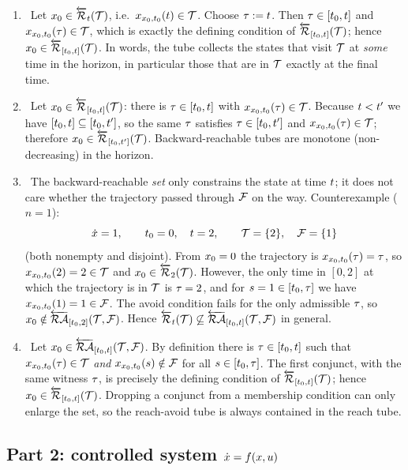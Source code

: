 \begin{enumerate}[label=(\alph*), itemsep=3pt]

\item \TRUE\
Let ${x}_0\in\overleftarrow{{\mathcal{R}}}_{{t}}({\mathcal{T}})$, i.e.\ ${x}_{{x}_0,{t}_0}({t})\in{\mathcal{T}}$. Choose ${\tau}:={t}$. Then
${\tau}\in[{t}_0,{t}]$ and ${x}_{{x}_0,{t}_0}({\tau})\in{\mathcal{T}}$, which is exactly the defining condition of
$\overleftarrow{{\mathcal{R}}}_{[{t}_0,{t}]}({\mathcal{T}})$; hence ${x}_0\in\overleftarrow{{\mathcal{R}}}_{[{t}_0,{t}]}({\mathcal{T}})$. In words, the tube collects the
states that visit ${\mathcal{T}}$ at \emph{some} time in the horizon, in particular those that are in
${\mathcal{T}}$ exactly at the final time.

\item \TRUE\
Let ${x}_0\in\overleftarrow{{\mathcal{R}}}_{[{t}_0,{t}]}({\mathcal{T}})$: there is ${\tau}\in[{t}_0,{t}]$ with
${x}_{{x}_0,{t}_0}({\tau})\in{\mathcal{T}}$. Because ${t}<{t}'$ we have $[{t}_0,{t}]\subseteq[{t}_0,{t}']$,
so the same ${\tau}$ satisfies ${\tau}\in[{t}_0,{t}']$ and ${x}_{{x}_0,{t}_0}({\tau})\in{\mathcal{T}}$; therefore
${x}_0\in\overleftarrow{{\mathcal{R}}}_{[{t}_0,{t}']}({\mathcal{T}})$. Backward-reachable tubes are monotone (non-decreasing) in the
horizon.

\item \FALSE\
The backward-reachable \emph{set} only constrains the state at time ${t}$; it does not care
whether the trajectory passed through ${\mathcal{F}}$ on the way. Counterexample ($n=1$):
\[
\dot{{x}} = 1,\qquad {t}_0=0,\quad {t}=2,\qquad {\mathcal{T}}=\{2\},\quad {\mathcal{F}}=\{1\}
\]
(both nonempty and disjoint). From ${x}_0=0$ the trajectory is ${x}_{{x}_0,{t}_0}({\tau})={\tau}$, so
${x}_{{x}_0,{t}_0}(2)=2\in{\mathcal{T}}$ and ${x}_0\in\overleftarrow{{\mathcal{R}}}_{2}({\mathcal{T}})$. However, the only time in $[0,2]$ at which the
trajectory is in ${\mathcal{T}}$ is ${\tau}=2$, and for $s=1\in[{t}_0,{\tau}]$ we have
${x}_{{x}_0,{t}_0}(1)=1\in{\mathcal{F}}$. The avoid condition fails for the only admissible ${\tau}$, so
${x}_0\notin\overleftarrow{{\mathcal{RA}}}_{[{t}_0,2]}({\mathcal{T}},{\mathcal{F}})$. Hence $\overleftarrow{{\mathcal{R}}}_{{t}}({\mathcal{T}})\not\subseteq\overleftarrow{{\mathcal{RA}}}_{[{t}_0,{t}]}({\mathcal{T}},{\mathcal{F}})$ in general.

\item \TRUE\
Let ${x}_0\in\overleftarrow{{\mathcal{RA}}}_{[{t}_0,{t}]}({\mathcal{T}},{\mathcal{F}})$. By definition there is ${\tau}\in[{t}_0,{t}]$ such that
${x}_{{x}_0,{t}_0}({\tau})\in{\mathcal{T}}$ \emph{and} ${x}_{{x}_0,{t}_0}(s)\notin{\mathcal{F}}$ for all $s\in[{t}_0,{\tau}]$. The
first conjunct, with the same witness ${\tau}$, is precisely the defining condition of
$\overleftarrow{{\mathcal{R}}}_{[{t}_0,{t}]}({\mathcal{T}})$; hence ${x}_0\in\overleftarrow{{\mathcal{R}}}_{[{t}_0,{t}]}({\mathcal{T}})$. Dropping a conjunct from a
membership condition can only enlarge the set, so the reach-avoid tube is always contained in the
reach tube.

\end{enumerate}

\subsection*{Part 2: controlled system $\dot{{x}}={f}({x},{u})$}


